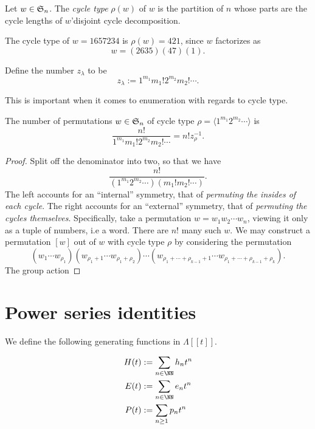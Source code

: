 \documentclass{article}
\newcommand{\frkS}{\ensuremath\mathfrak{S}}
\begin{document}
\begin{definition}
    Let $w \in \frkS_n$. The \textit{cycle type} $\rho(w)$ of $w$ is the partition of $n$ whose parts are the cycle lengths of $w$'disjoint cycle decomposition.
\end{definition}

\begin{example}
    The cycle type of $w = 1657234$ is $\rho(w) = 421$, since $w$ factorizes as
    \[
        w = (2635)(47)(1).
    \]
\end{example}

\begin{definition}
    Define the number $z_\lambda$ to be
    \[
        z_\lambda := 1^{m_1}m_1!2^{m_2}m_2!\cdots.
    \]
\end{definition}

This is important when it comes to enumeration with regards to cycle type.

\begin{theorem}
    The number of permutations $w \in \frkS_n$ of cycle type $\rho = \langle 1^{m_1}2^{m_2}\cdots\rangle$ is
    \[
        \frac{n!}{1^{m_1}m_1!2^{m_2}m_2!\cdots} = n!z_\rho^{-1}.
    \]
\end{theorem}

\begin{proof}
    Split off the denominator into two, so that we have
    \[
        \frac{n!}{(1^{m_1}2^{m_2}\cdots)(m_1!m_2!\cdots)}.
    \]
    The left accounts for an ``internal'' symmetry, that of \textit{permuting the insides of each cycle}. 
    The right accounts for an ``external'' symmetry, that of \textit{permuting the cycles themselves}.
    Specifically, take a permutation $w = w_1w_2\cdots w_n$, viewing it only as a tuple of numbers, i.e a word.
    There are $n!$ many such $w$.
    We may construct a permutation $[w]$ out of $w$ with cycle type $\rho$ by considering the permutation
    \[
        (w_1\cdots w_{\rho_1})
        (w_{\rho_1+1}\cdots w_{\rho_1+\rho_2})\cdots(w_{\rho_1+\cdots+\rho_{k-1}+1}\cdots w_{\rho_1+\cdots+\rho_{k-1}+\rho_k}).
    \]
    The group action 
\end{proof}

\section{Power series identities}

We define the following generating functions in $\Lambda[[t]]$.
\begin{definition}
    \begin{align*}
        H(t) &:= \sum_{n\in\NN}h_n t^n \\
        E(t) &:= \sum_{n\in\NN}e_n t^n \\
        P(t) &:= \sum_{n\geq1}p_n t^n
    \end{align*}
\end{definition}
\end{document}
